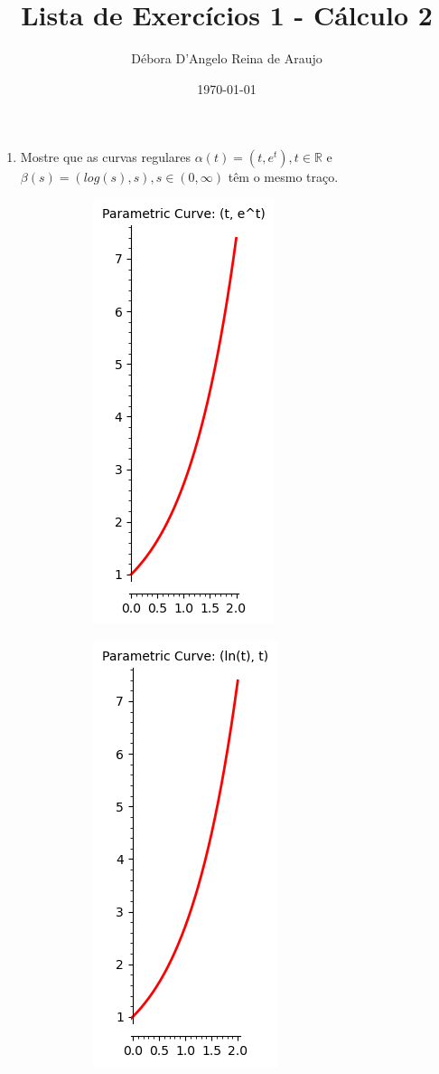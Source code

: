 \documentclass{article}
\begin{document}
\title{Lista de Exercícios 1 - Cálculo 2}
\author{Débora D'Angelo Reina de Araujo}
\date{\today}

\maketitle

\begin{enumerate}
    \item Mostre que as curvas regulares $\alpha(t) = (t, e^t), t \in \mathbb{R}$ e $\beta(s)=(log(s),s),s \in (0, \infty)$ têm o mesmo traço. \\
    
    \begin{figure}[!htb]
        \centering 

        \begin{subfigure}{\textwidth} %
            \centering
            \includegraphics[width=0.3\linewidth]{curve1.png} %
            \label{fig:imagem1}
        \end{subfigure}
        \begin{subfigure}{\textwidth} %
            \centering
            \includegraphics[width=0.3\linewidth]{curve2.png} %
            \label{fig:imagem2}
        \end{subfigure}
        \label{fig:exemplo_duas_imagens} %
    \end{figure}


\end{enumerate}
\end{document}

